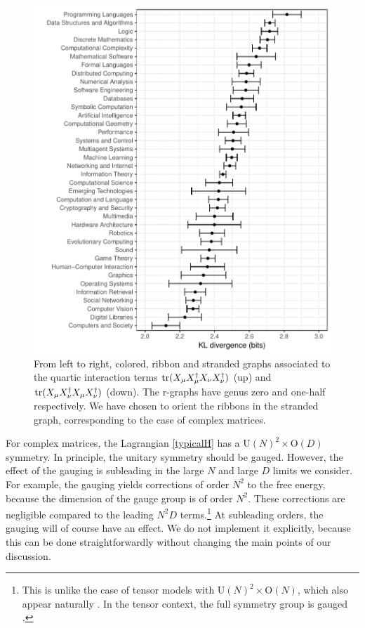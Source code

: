 \documentclass[12pt]{article}
\numberwithin{equation}{section}
\begin{document}
%
\begin{figure}
\centerline{\includegraphics[width=6in]{fig1.pdf}}
\caption{From left to right, colored, ribbon and stranded graphs associated to the quartic interaction terms $\mathop{\rm tr}\nolimits (X_{\mu}X_{\mu}^{\dagger}X_{\nu}X_{\nu}^{\dagger})$ (up) and $\mathop{\rm tr}\nolimits (X_{\mu}X_{\nu}^{\dagger}X_{\mu}X_{\nu}^{\dagger})$ (down). The r-graphs have genus zero and one-half respectively. We have chosen to orient the ribbons in the stranded graph, corresponding to the case of complex matrices.\label{fig1}}
\end{figure}
%

For complex matrices, the Lagrangian \eqref{typicalH} has a $\text{U}(N)^{2}\times\text{O}(D)$ symmetry. In principle, the unitary symmetry should be gauged. However, the effect of the gauging is subleading in the large $N$ and large $D$ limits we consider. For example, the gauging yields corrections of order $N^{2}$ to the free energy, because the dimension of the gauge group is of order $N^{2}$. These corrections are negligible compared to the leading $N^{2}D$ terms.\footnote{This is unlike the case of tensor models with $\text{U}(N)^{2}\times\text{O}(N)$, which also appear naturally \cite{Tanasa,klebanov}. In the tensor context, the full symmetry group is gauged \cite{klebanovgauging}.} At subleading orders, the gauging will of course have an effect. We do not implement it explicitly, because this can be done straightforwardly without changing the main points of our discussion. 
\end{document}
